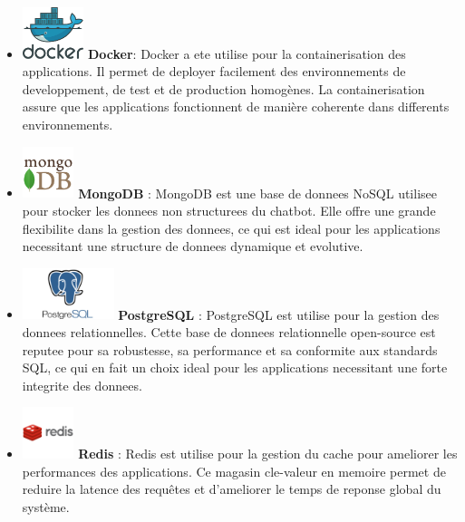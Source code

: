 \documentclass[a4paper, 11pt, openany]{report}
\begin{document}
\begin{itemize}
    \item  \includegraphics[height=1.5cm]{images/docker.png} \hspace{5pt} \textbf{Docker}: 
    Docker a ete utilise pour la containerisation des applications. Il permet de deployer facilement des environnements de developpement, de test et de production homogènes. La containerisation assure que les applications fonctionnent de manière coherente dans differents environnements.

    \item \includegraphics[height=1.5cm]{images/mongo.png} \hspace{5pt} \textbf{MongoDB}  : 
    MongoDB est une base de donnees NoSQL utilisee pour stocker les donnees non structurees du chatbot. Elle offre une grande flexibilite dans la gestion des donnees, ce qui est ideal pour les applications necessitant une structure de donnees dynamique et evolutive.

    \item \includegraphics[height=1.5cm]{images/postgres.png} \hspace{5pt} \textbf{PostgreSQL}  : 
    PostgreSQL est utilise pour la gestion des donnees relationnelles. Cette base de donnees relationnelle open-source est reputee pour sa robustesse, sa performance et sa conformite aux standards SQL, ce qui en fait un choix ideal pour les applications necessitant une forte integrite des donnees.

    \item \includegraphics[height=1.5cm]{images/redis.png} \hspace{5pt} \textbf{Redis} : 
    Redis est utilise pour la gestion du cache pour ameliorer les performances des applications. Ce magasin cle-valeur en memoire permet de reduire la latence des requêtes et d'ameliorer le temps de reponse global du système.


\end{itemize}
\end{document}
